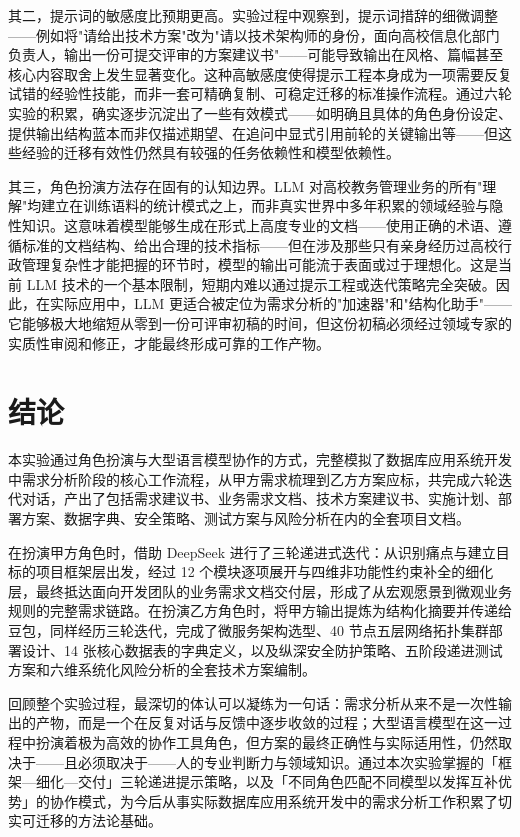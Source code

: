 \documentclass[12pt, a4paper]{academics}
\begin{document}
其二，提示词的敏感度比预期更高。实验过程中观察到，提示词措辞的细微调整——例如将"请给出技术方案"改为"请以技术架构师的身份，面向高校信息化部门负责人，输出一份可提交评审的方案建议书"——可能导致输出在风格、篇幅甚至核心内容取舍上发生显著变化。这种高敏感度使得提示工程本身成为一项需要反复试错的经验性技能，而非一套可精确复制、可稳定迁移的标准操作流程。通过六轮实验的积累，确实逐步沉淀出了一些有效模式——如明确且具体的角色身份设定、提供输出结构蓝本而非仅描述期望、在追问中显式引用前轮的关键输出等——但这些经验的迁移有效性仍然具有较强的任务依赖性和模型依赖性。

其三，角色扮演方法存在固有的认知边界。LLM 对高校教务管理业务的所有"理解"均建立在训练语料的统计模式之上，而非真实世界中多年积累的领域经验与隐性知识。这意味着模型能够生成在形式上高度专业的文档——使用正确的术语、遵循标准的文档结构、给出合理的技术指标——但在涉及那些只有亲身经历过高校行政管理复杂性才能把握的环节时，模型的输出可能流于表面或过于理想化。这是当前 LLM 技术的一个基本限制，短期内难以通过提示工程或迭代策略完全突破。因此，在实际应用中，LLM 更适合被定位为需求分析的"加速器"和"结构化助手"——它能够极大地缩短从零到一份可评审初稿的时间，但这份初稿必须经过领域专家的实质性审阅和修正，才能最终形成可靠的工作产物。

\section{结论}

本实验通过角色扮演与大型语言模型协作的方式，完整模拟了数据库应用系统开发中需求分析阶段的核心工作流程，从甲方需求梳理到乙方方案应标，共完成六轮迭代对话，产出了包括需求建议书、业务需求文档、技术方案建议书、实施计划、部署方案、数据字典、安全策略、测试方案与风险分析在内的全套项目文档。

在扮演甲方角色时，借助 DeepSeek 进行了三轮递进式迭代：从识别痛点与建立目标的项目框架层出发，经过 12 个模块逐项展开与四维非功能性约束补全的细化层，最终抵达面向开发团队的业务需求文档交付层，形成了从宏观愿景到微观业务规则的完整需求链路。在扮演乙方角色时，将甲方输出提炼为结构化摘要并传递给豆包，同样经历三轮迭代，完成了微服务架构选型、40 节点五层网络拓扑集群部署设计、14 张核心数据表的字典定义，以及纵深安全防护策略、五阶段递进测试方案和六维系统化风险分析的全套技术方案编制。

回顾整个实验过程，最深切的体认可以凝练为一句话：需求分析从来不是一次性输出的产物，而是一个在反复对话与反馈中逐步收敛的过程；大型语言模型在这一过程中扮演着极为高效的协作工具角色，但方案的最终正确性与实际适用性，仍然取决于——且必须取决于——人的专业判断力与领域知识。通过本次实验掌握的「框架—细化—交付」三轮递进提示策略，以及「不同角色匹配不同模型以发挥互补优势」的协作模式，为今后从事实际数据库应用系统开发中的需求分析工作积累了切实可迁移的方法论基础。
\end{document}
